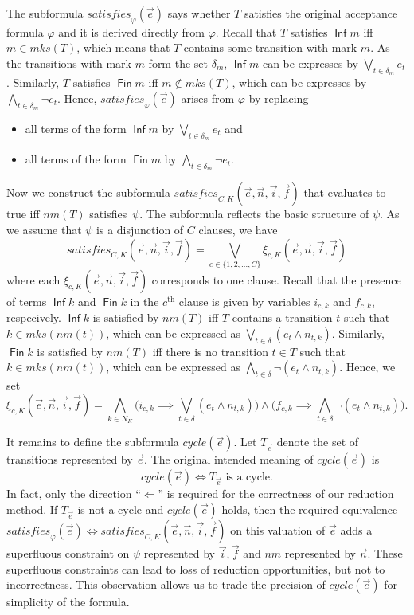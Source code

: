\documentclass[a4paper,UKenglish,cleveref, autoref, thm-restate]{lipics-v2021}
\DeclareMathOperator{\Inf}{\mathsf{Inf}}
\DeclareMathOperator{\Fin}{\mathsf{Fin}}
\newcommand{\mks}{\mathit{mks}}
\newcommand{\rem}{\mathit{nm}}
\newcommand{\mcycle}{\mathit{cycle}}
\newcommand{\msat}{\mathit{satisfies}}
\newcommand{\Te}{T_{\vec{e}}}
\begin{document}
The subformula $\msat_\varphi(\vec{e})$ says whether $T$ satisfies the
original acceptance formula $\varphi$ and it is derived directly from
$\varphi$. Recall that $T$ satisfies $\Inf m$ iff $m\in\mks(T)$, which
means that $T$ contains some transition with mark $m$. As the
transitions with mark $m$ form the set $\delta_m$, $\Inf m$ can be
expresses by $\bigvee_{t\in\delta_m}e_t$. Similarly, $T$ satisfies
$\Fin m$ iff $m\not\in\mks(T)$, which can be expresses by
$\bigwedge_{t\in\delta_m}\neg e_t$. Hence, $\msat_\varphi(\vec{e})$
arises from $\varphi$ by replacing
\begin{itemize}
\item all terms of the form $\Inf m$ by $\bigvee_{t\in\delta_m}e_t$ and
\item all terms of the form $\Fin m$ by $\bigwedge_{t\in\delta_m}\neg e_t$.
\end{itemize}

Now we construct the subformula
$\msat_{C,K}(\vec{e},\vec{n},\vec{i},\vec{f})$ that evaluates to true
iff $\rem(T)$ satisfies~$\psi$. The subformula reflects the basic
structure of $\psi$. As we assume that $\psi$ is a disjunction of $C$
clauses, we have
\[
  \msat_{C,K}(\vec{e},\vec{n},\vec{i},\vec{f})=\bigvee_{c\in\{1,2,\ldots,C\}}\xi_{c,K}(\vec{e},\vec{n},\vec{i},\vec{f})
\]
where each $\xi_{c,K}(\vec{e},\vec{n},\vec{i},\vec{f})$ corresponds to
one clause. Recall that the presence of terms $\Inf k$ and $\Fin k$ in
the $c^\textrm{th}$ clause is given by variables $i_{c,k}$ and
$f_{c,k}$, respecively. $\Inf k$ is satisfied by $\rem(T)$ iff $T$
contains a transition $t$ such that $k\in\mks(\rem(t))$, which can be
expressed as $\bigvee_{t\in\delta}(e_t\wedge n_{t,k})$. Similarly,
$\Fin k$ is satisfied by $\rem(T)$ iff there is no transition $t\in T$
such that $k\in\mks(\rem(t))$, which can be expressed as
$\bigwedge_{t\in\delta}\neg(e_t\wedge n_{t,k})$. Hence, we set
\[
  \xi_{c,K}(\vec{e},\vec{n},\vec{i},\vec{f})=
  \bigwedge_{k\in N_K}\Big(i_{c,k}\implies\bigvee_{t\in\delta}(e_t\wedge n_{t,k})\Big)\wedge\Big(f_{c,k}\implies\bigwedge_{t\in\delta}\neg(e_t\wedge n_{t,k})\Big).
\]

It remains to define the subformula $\mcycle(\vec{e})$. Let $\Te$
denote the set of transitions represented by $\vec{e}$. The original
intended meaning of $\mcycle(\vec{e})$ is
\[
  \mcycle(\vec{e}) \iff \Te\textrm{ is a cycle}.
\]
In fact, only the direction ``$\Longleftarrow$'' is required for the
correctness of our reduction method. If $\Te$ is not a cycle and
$\mcycle(\vec{e})$ holds, then the required equivalence
$\msat_\varphi(\vec{e}) \iff
\msat_{C,K}(\vec{e},\vec{n},\vec{i},\vec{f})$ on this valuation of
$\vec{e}$ adds a superfluous constraint on $\psi$ represented by
$\vec{i},\vec{f}$ and $\rem$ represented by $\vec{n}$. These
superfluous constraints can lead to loss of reduction opportunities,
but not to incorrectness. This observation allows us to trade the
precision of $\mcycle(\vec{e})$ for simplicity of the formula.
\end{document}
